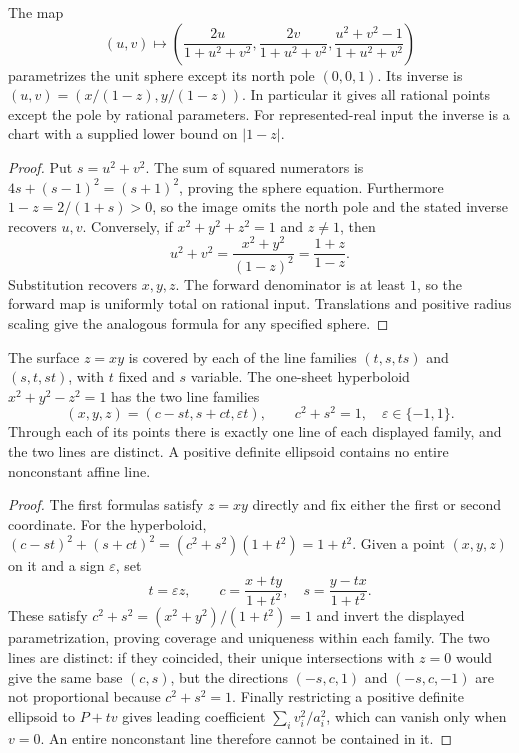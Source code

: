 \begin{theorem}
\label{con:sphere-param}
The map
\[
 (u,v)\longmapsto
 \left(\frac{2u}{1+u^2+v^2},
       \frac{2v}{1+u^2+v^2},
       \frac{u^2+v^2-1}{1+u^2+v^2}\right)
\]
parametrizes the unit sphere except its north pole $(0,0,1)$.
Its inverse is $(u,v)=(x/(1-z),y/(1-z))$. In particular it gives
all rational points except the pole by rational parameters.
For represented-real input the inverse is a chart with a supplied
lower bound on $|1-z|$.
\end{theorem}
\begin{proof}
Put $s=u^2+v^2$. The sum of squared numerators is
$4s+(s-1)^2=(s+1)^2$, proving the sphere equation.
Furthermore $1-z=2/(1+s)>0$, so the image omits the north pole and
the stated inverse recovers $u,v$. Conversely, if $x^2+y^2+z^2=1$
and $z\ne1$, then
\[
 u^2+v^2=\frac{x^2+y^2}{(1-z)^2}=\frac{1+z}{1-z}.
\]
Substitution recovers $x,y,z$. The forward denominator is at least
$1$, so the forward map is uniformly total on rational input.
Translations and positive radius scaling give the analogous formula
for any specified sphere.
\end{proof}

\begin{theorem}
\label{con:rulings}
The surface $z=xy$ is covered by each of the line families
$(t,s,ts)$ and $(s,t,st)$, with $t$ fixed and $s$ variable.
The one-sheet hyperboloid $x^2+y^2-z^2=1$ has the two line families
\[
 (x,y,z)=(c-st,s+ct,\varepsilon t),\qquad
 c^2+s^2=1,\quad\varepsilon\in\{-1,1\}.
\]
Through each of its points there is exactly one line of each displayed
family, and the two lines are distinct. A positive definite ellipsoid
contains no entire nonconstant affine line.
\end{theorem}
\begin{proof}
The first formulas satisfy $z=xy$ directly and fix either the first
or second coordinate. For the hyperboloid,
$(c-st)^2+(s+ct)^2=(c^2+s^2)(1+t^2)=1+t^2$.
Given a point $(x,y,z)$ on it and a sign $\varepsilon$, set
\[
 t=\varepsilon z,\qquad
 c=\frac{x+ty}{1+t^2},\quad s=\frac{y-tx}{1+t^2}.
\]
These satisfy $c^2+s^2=(x^2+y^2)/(1+t^2)=1$ and invert the
displayed parametrization, proving coverage and uniqueness within
each family. The two lines are distinct: if they coincided, their unique
intersections with $z=0$ would give the same base $(c,s)$, but the
directions $(-s,c,1)$ and $(-s,c,-1)$ are not proportional because
$c^2+s^2=1$. Finally restricting a positive definite ellipsoid to
$P+tv$ gives leading coefficient $\sum_i v_i^2/a_i^2$, which can
vanish only when $v=0$. An entire nonconstant line therefore cannot
be contained in it.
\end{proof}

